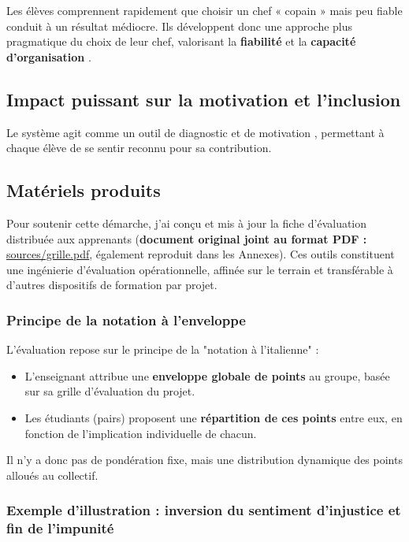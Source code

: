 Les élèves comprennent rapidement que choisir un chef « copain » mais peu fiable conduit à un résultat médiocre. Ils développent donc une approche plus pragmatique du choix de leur chef, valorisant la \textbf{fiabilité} et la \textbf{capacité d'organisation} \parencite{competences_transversales}.

\subsection{Impact puissant sur la motivation et l'inclusion}

Le système agit comme un outil de diagnostic et de motivation \parencite{pedagogie_active}, permettant à chaque élève de se sentir reconnu pour sa contribution.



\subsection{Matériels produits}

Pour soutenir cette démarche, j'ai conçu et mis à jour la fiche d'évaluation distribuée aux apprenants (\textbf{document original joint au format PDF :} \url{sources/grille.pdf}, également reproduit dans les Annexes). Ces outils constituent une ingénierie d'évaluation opérationnelle, affinée sur le terrain et transférable à d'autres dispositifs de formation par projet.

\subsubsection{Principe de la notation à l'enveloppe}
L'évaluation repose sur le principe de la "notation à l'italienne" :
\begin{itemize}
    \item L'enseignant attribue une \textbf{enveloppe globale de points} au groupe, basée sur sa grille d'évaluation du projet.
    \item Les étudiants (pairs) proposent une \textbf{répartition de ces points} entre eux, en fonction de l'implication individuelle de chacun.
\end{itemize}

Il n'y a donc pas de pondération fixe, mais une distribution dynamique des points alloués au collectif.

\subsubsection{Exemple d'illustration : inversion du sentiment d'injustice et fin de l'impunité}

